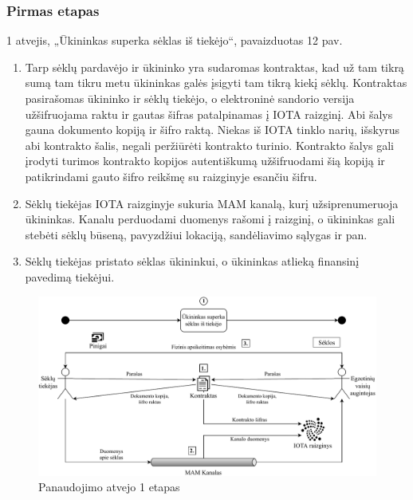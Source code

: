 \subsubsection{Pirmas etapas}

1 atvejis, „Ūkininkas superka sėklas iš tiekėjo“, pavaizduotas 12 pav.
\begin{enumerate}
    \item Tarp sėklų pardavėjo ir ūkininko yra sudaromas kontraktas, kad už tam tikrą sumą tam tikru metu ūkininkas galės įsigyti tam tikrą kiekį sėklų. Kontraktas pasirašomas ūkininko ir sėklų tiekėjo, o elektroninė sandorio versija užšifruojama raktu ir gautas šifras patalpinamas į IOTA raizginį. Abi šalys gauna dokumento kopiją ir šifro raktą. Niekas iš IOTA tinklo narių, išskyrus abi kontrakto šalis, negali peržiūrėti kontrakto turinio. Kontrakto šalys gali įrodyti turimos kontrakto kopijos autentiškumą užšifruodami šią kopiją ir patikrindami gauto šifro reikšmę su raizginyje esančiu šifru.
    \item Sėklų tiekėjas IOTA raizginyje sukuria MAM kanalą, kurį užsiprenumeruoja ūkininkas. Kanalu perduodami duomenys rašomi į raizginį, o ūkininkas gali stebėti sėklų būseną, pavyzdžiui lokaciją, sandėliavimo sąlygas ir pan.
    \item Sėklų tiekėjas pristato sėklas ūkininkui, o ūkininkas atlieką finansinį pavedimą tiekėjui.
\end{enumerate}

\begin{figure}[H]
    \centering
    \includegraphics[scale=0.7]{images/iota-usecase-1}
    \caption{Panaudojimo atvejo 1 etapas}
\end{figure}




